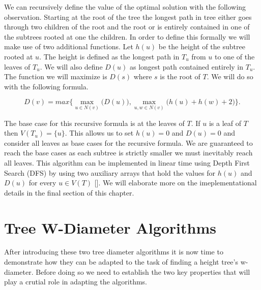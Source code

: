 We can recursively define the value of the optimal solution with the following observation. Starting at the root of the tree the longest path in tree either goes through two children of the root and the root or is entirely contained in one of the subtrees rooted at one the children. In order to define this formally we will make use of two additional functions. Let $h(u)$ be the height of the subtree rooted at $u$. The height is defined as the longest path in $T_u$ from $u$ to one of the leaves of $T_u$. We will also define $D(u)$ as longest path contained entirely in $T_u$. The function we will maximize is $D(s)$ where $s$ is the root of $T$. We will do so with the following formula.

$$ D(v) = max\bigg\{ \max\limits_{u \in N(v)}\bigg(D(u)\bigg), \max\limits_{u, w \in N(v)}\bigg(h(u) + h(w) + 2\bigg) \bigg\}. $$

The base case for this recursive formula is at the leaves of $T$. If $u$ is a leaf of $T$ then $V(T_u) = \{u\}$. This allows us to set $h(u) = 0$ and $D(u) = 0$ and consider all leaves as base cases for the recursive formula. We are guaranteed to reach the base cases as each subtree is strictly smaller we must inevitably reach all leaves. This algorithm can be implemented in linear time using Depth First Search (DFS) by using two auxiliary arrays that hold the values for $h(u)$ and $D(u)$ for every $u \in V(T)$ []. We will elaborate more on the imeplementational details in the final section of this chapter.


\section{Tree W-Diameter Algorithms}


After introducing these two tree diameter algorithms it is now time to demonstrate how they can be adapted to the task of finding a height tree's w-diameter. Before doing so we need to establish the two key properties that will play a crutial role in adapting the algorithms.


